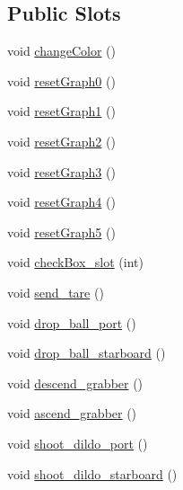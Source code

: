 \subsection*{Public Slots}
\begin{DoxyCompactItemize}
\item 
void \hyperlink{classWatchdog_a965edc015db4fc63f2629684d502e242}{change\+Color} ()
\item 
void \hyperlink{classWatchdog_a25168e92aa6aa14982760e6d21f40228}{reset\+Graph0} ()
\item 
void \hyperlink{classWatchdog_adb6d8c61ec2824b582a5e7d609d53f79}{reset\+Graph1} ()
\item 
void \hyperlink{classWatchdog_a7466a05f4f26b9085321f07e36aef29f}{reset\+Graph2} ()
\item 
void \hyperlink{classWatchdog_a0544197c37fddc5744e71215e5c4a86f}{reset\+Graph3} ()
\item 
void \hyperlink{classWatchdog_a44cab89d601e54fc9d20c7f93641f1cf}{reset\+Graph4} ()
\item 
void \hyperlink{classWatchdog_af37f7fbbcd8411b8773c41cb445fd4a9}{reset\+Graph5} ()
\item 
void \hyperlink{classWatchdog_afa9f038ff3c4c3fd14e62b1108c43e4c}{check\+Box\+\_\+slot} (int)
\item 
void \hyperlink{classWatchdog_a2ab59c5eb15131c128dca1e655fa48da}{send\+\_\+tare} ()
\item 
void \hyperlink{classWatchdog_a29027107da970bd6dba2655d756a4f3a}{drop\+\_\+ball\+\_\+port} ()
\item 
void \hyperlink{classWatchdog_a3ea7987c35a510eef29a512c50194599}{drop\+\_\+ball\+\_\+starboard} ()
\item 
void \hyperlink{classWatchdog_a1321b84d0d8bd916cde801cc7b2549eb}{descend\+\_\+grabber} ()
\item 
void \hyperlink{classWatchdog_a462dc9238fc832d17bfb978df9f79170}{ascend\+\_\+grabber} ()
\item 
void \hyperlink{classWatchdog_aa824002e2e6f936cdb4868e31d1c5953}{shoot\+\_\+dildo\+\_\+port} ()
\item 
void \hyperlink{classWatchdog_a1f5b758fe42031a55b24bb21822e2da4}{shoot\+\_\+dildo\+\_\+starboard} ()
\end{DoxyCompactItemize}
